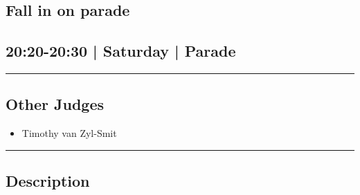 \documentclass[10pt, A5]{article}
\begin{document}
		\begin{framed}
			\begin{minipage}{\textwidth}

			\setcounter{section}{73}
							\section{Fall in on parade}
						
			\subsection*{20:20-20:30 | Saturday | Parade}

			\vspace{0.25cm}
			\hrule
			\vspace{0.25cm}


			\subsection*{Other Judges}
							

				\begin{multicols}{2}

			\begin{itemize}
											\item Timothy van Zyl-Smit
								\end{itemize}

			\vfill\null
			\columnbreak

			\begin{itemize}
								\end{itemize}

			\vfill\null

			\end{multicols}

			\vspace{0.25cm}
			\hrule
			\vspace{0.25cm}

			\begin{minipage}{\textwidth}
			\subsection*{\faListAlt \: Description}
			
			\end{minipage}


	\end{minipage}
	\end{framed}

	
\end{document}
